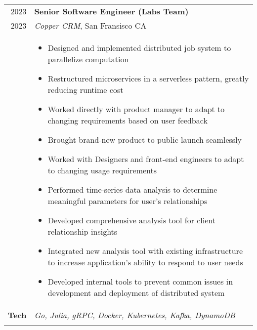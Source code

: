 \documentclass[a4paper,10pt]{article}
\newcommand{\br}{\\\multicolumn{2}{c}{}}
\begin{document}
\begin{tabular}{r|p{15cm}}
  \textsc{2023}  & \textbf{Senior Software Engineer (Labs Team)} \\
  \textsc{2023} & \textit{Copper CRM}, San Fransisco CA
  \\ &  
       \begin{itemize}
       \item Designed and implemented distributed job system to parallelize computation
       \item Restructured microservices in a serverless pattern, greatly reducing runtime cost
       \item Worked directly with product manager to adapt to changing requirements based on user feedback
       \item Brought brand-new product to public launch seamlessly
       \item Worked with Designers and front-end engineers to adapt to changing usage requirements
       \item Performed time-series data analysis to determine meaningful parameters for user's relationships
       \item Developed comprehensive analysis tool for client relationship insights
       \item Integrated new analysis tool with existing infrastructure to increase application's ability to respond to user needs
       \item Developed internal tools to prevent common issues in development and deployment of distributed system
       \end{itemize} \\
  \textbf{Tech} & \textit{Go, Julia, gRPC, Docker, Kubernetes, Kafka, DynamoDB} \br \\
\end{tabular}
\end{document}
